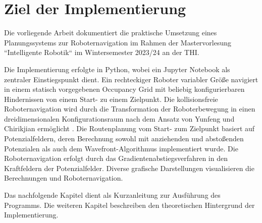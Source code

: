 \chapter{Ziel der Implementierung}

Die vorliegende Arbeit dokumentiert die praktische Umsetzung eines Planungssystems zur Roboternavigation im Rahmen der Mastervorlesung ``Intelligente Robotik`` im Wintersemester 2023/24 an der THI.

Die Implementierung erfolgte in Python, wobei ein Jupyter Notebook als zentraler Einstiegspunkt dient. 
Ein rechteckiger Roboter variabler Größe navigiert in einem statisch vorgegebenen Occupancy Grid mit beliebig konfigurierbaren Hindernissen von einem Start- zu einem Zielpunkt.
Die kollisionsfreie Roboternavigation wird durch die Transformation der Roboterbewegung in einen dreidimensionalen Konfigurationsraum nach dem Ansatz von Yunfeng und Chirikjian ermöglicht \cite{wang.2000}.
Die Routenplanung vom Start- zum Zielpunkt basiert auf Potenzialfeldern, deren Berechnung sowohl mit anziehenden und abstoßenden Potenzialen als auch dem Wavefront-Algorithmus implementiert wurde. 
Die Roboternavigation erfolgt durch das Gradientenabstiegsverfahren in den Kraftfeldern der Potenzialfelder. 
Diverse grafische Darstellungen visualisieren die Berechnungen und Roboternavigation.

Das nachfolgende Kapitel dient als Kurzanleitung zur Ausführung des Programms. Die weiteren Kapitel beschreiben den theoretischen Hintergrund der Implementierung.

%
